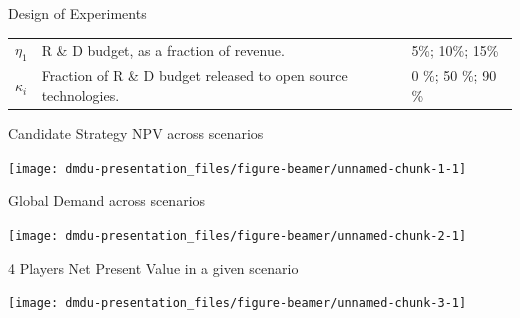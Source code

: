 \documentclass[12pt,ignorenonframetext,]{beamer}
\begin{document}
\begin{frame}{Design of Experiments}
\begin{longtable}[]{@{}lll@{}}
\begin{minipage}[t]{0.14\columnwidth}\raggedright\strut
\(\eta_1\)\strut
\end{minipage} & \begin{minipage}[t]{0.47\columnwidth}\raggedright\strut
R \& D budget, as a fraction of revenue.\strut
\end{minipage} & \begin{minipage}[t]{0.30\columnwidth}\raggedright\strut
5\%; 10\%; 15\%\strut
\end{minipage}\tabularnewline
\begin{minipage}[t]{0.14\columnwidth}\raggedright\strut
\(\kappa_i\)\strut
\end{minipage} & \begin{minipage}[t]{0.47\columnwidth}\raggedright\strut
Fraction of R \& D budget released to open source technologies.\strut
\end{minipage} & \begin{minipage}[t]{0.30\columnwidth}\raggedright\strut
0 \%; 50 \%; 90 \%\strut
\end{minipage}\tabularnewline
\bottomrule
\end{longtable}

\end{frame}

\begin{frame}{Candidate Strategy NPV across scenarios}

\begin{center}\texttt{[image: dmdu-presentation\_files/figure-beamer/unnamed-chunk-1-1]} \end{center}

\end{frame}

\begin{frame}{Global Demand across scenarios}

\begin{center}\texttt{[image: dmdu-presentation\_files/figure-beamer/unnamed-chunk-2-1]} \end{center}

\end{frame}

\begin{frame}{4 Players Net Present Value in a given scenario}

\begin{center}\texttt{[image: dmdu-presentation\_files/figure-beamer/unnamed-chunk-3-1]} \end{center}

\end{frame}
\end{document}
